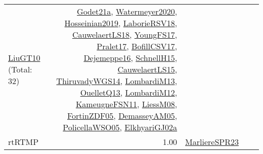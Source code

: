 {\begin{longtable}{p{3cm}r>{\raggedright\arraybackslash}p{6cm}>{\raggedright\arraybackslash}p{6cm}>{\raggedright\arraybackslash}p{8cm}}
\hyperref[detail:LiuGT10]{LiuGT10} (Total: 32) & \hyperref[detail:Godet21a]{Godet21a}, \hyperref[detail:Watermeyer2020]{Watermeyer2020}, \hyperref[detail:Hosseinian2019]{Hosseinian2019}, \hyperref[detail:LaborieRSV18]{LaborieRSV18}, \hyperref[detail:CauwelaertLS18]{CauwelaertLS18}, \hyperref[detail:YoungFS17]{YoungFS17}, \hyperref[detail:Pralet17]{Pralet17}, \hyperref[detail:BofillCSV17]{BofillCSV17}, \hyperref[detail:Dejemeppe16]{Dejemeppe16}, \hyperref[detail:SchnellH15]{SchnellH15}, \hyperref[detail:CauwelaertLS15]{CauwelaertLS15}, \hyperref[detail:ThiruvadyWGS14]{ThiruvadyWGS14}, \hyperref[detail:LombardiM13]{LombardiM13}, \hyperref[detail:OuelletQ13]{OuelletQ13}, \hyperref[detail:LombardiM12]{LombardiM12}, \hyperref[detail:KameugneFSN11]{KameugneFSN11}, \hyperref[detail:LiessM08]{LiessM08}, \hyperref[detail:FortinZDF05]{FortinZDF05}, \hyperref[detail:DemasseyAM05]{DemasseyAM05}, \hyperref[detail:PolicellaWSO05]{PolicellaWSO05}, \hyperref[detail:ElkhyariGJ02a]{ElkhyariGJ02a}\\
\index{rtRTMP}\index{Classification!rtRTMP}rtRTMP &  1.00 & \hyperref[detail:MarliereSPR23]{MarliereSPR23} &  & \\

\end{longtable}}
